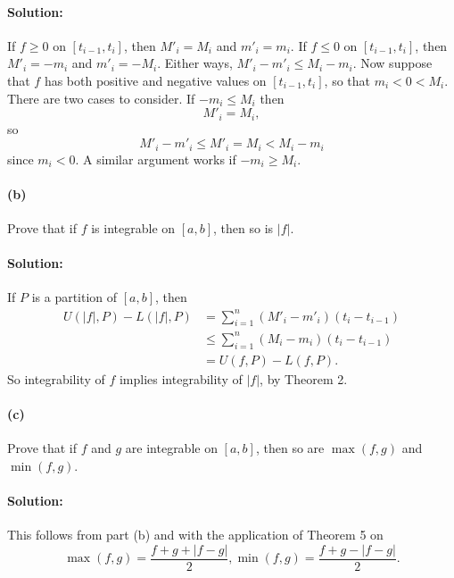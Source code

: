 \documentclass{article}
\begin{document}
\paragraph{Solution:} If $f \geq 0$ on $[t_{i - 1}, t_i]$, then $M'_i = M_i$
and $m'_i = m_i$. If $f \leq 0$ on $[t_{i - 1}, t_i]$, then $M'_i = -m_i$ and
$m'_i = -M_i$. Either ways, $M'_i - m'_i \leq M_i - m_i$. Now suppose that $f$
has both positive and negative values on $[t_{i - 1}, t_i]$, so that $m_i < 0 <
M_i$. There are two cases to consider. If $-m_i \leq M_i$ then
\begin{equation*}
  M'_i = M_i,
\end{equation*} so \begin{equation*}
  M'_i - m'_i \leq M'_i = M_i < M_i - m_i
\end{equation*} since $m_i < 0$. A similar argument works if $-m_i \geq M_i$.

\paragraph{(b)} Prove that if $f$ is integrable on $[a, b]$, then so is $|f|$.

\paragraph{Solution:} If $P$ is a partition of $[a, b]$, then \begin{align*}
  U(|f|, P) - L(|f|, P) &= \sum_{i = 1}^n (M'_i - m'_i)(t_i - t_{i - 1}) \\
    &\leq \sum_{i = 1}^n (M_i - m_i)(t_i - t_{i - 1}) \\
    &= U(f, P) - L(f, P).
\end{align*} So integrability of $f$ implies integrability of $|f|$, by
Theorem 2.

\paragraph{(c)} Prove that if $f$ and $g$ are integrable on $[a, b]$, then so
are $\max(f, g)$ and $\min(f, g)$.

\paragraph{Solution:} This follows from part (b) and with the application of
Theorem 5 on \begin{equation*}
  \max(f, g) = \frac{f + g + |f - g|}{2}, \min(f, g)
  = \frac{f + g - |f - g|}{2}.
\end{equation*}
\end{document}
